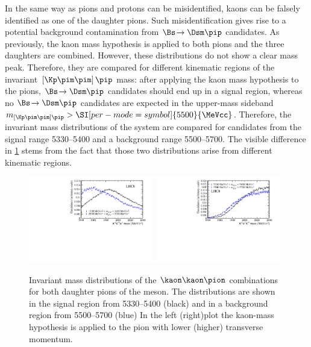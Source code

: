 In the same way as pions and protons can be misidentified, kaons can be falsely identified as one of the \Dm daughter pions.
Such misidentification gives rise to a potential background contamination from $\Bs\!\to\Dsm\pip$ candidates.
As previously, the kaon mass hypothesis is applied to both pions and the three \Dm daughters are combined.
However,  these distributions do not show a clear mass peak.
Therefore, they are compared for different kinematic regions of the invariant $\left[\Kp\pim\pim\right]\pip$ mass: after applying the kaon mass hypothesis to the pions, $\Bs\!\to\Dsm\pip$ candidates should end up in a \Bs signal region, whereas no $\Bs\!\to\Dsm\pip$ candidates are expected in the upper-mass sideband $m_{\left[\Kp\pim\pim\right]\pip}>\SI[per-mode=symbol]{5500}{\MeVcc}$.
Therefore, the invariant mass distributions of the \kaon\kaon\pion system are compared for candidates from the \Bs signal range \SIrange[per-mode=symbol]{5330}{5400}{\MeVcc} and a background range \SIrange[per-mode=symbol]{5500}{5700}{\MeVcc}.
The visible difference in \cref{fig:DsVeto} stems from the fact that those two distributions arise from different kinematic regions.
\begin{figure}[tbp]
    \centering
    \includegraphics[width=0.485\textwidth]{06selection/figs/DsHypo1.pdf}
    \includegraphics[width=0.485\textwidth]{06selection/figs/DsHypo2.pdf}
    \caption{Invariant mass distributions of the $\kaon\kaon\pion$ combinations for both daughter pions of the \Dm meson.
    The distributions are shown in the \Bs signal region from \SIrange[per-mode=symbol]{5330}{5400}{\MeVcc} (black) and in a background region from \SIrange[per-mode=symbol]{5500}{5700}{\MeVcc} (blue)
    In the left (right)plot the kaon-mass hypothesis is applied to the pion with lower (higher) transverse momentum.}
    \label{fig:DsVeto}
\end{figure}
